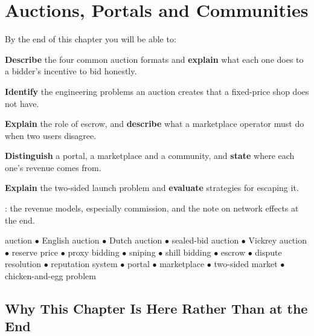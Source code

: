 \chapter{Auctions, Portals and Communities}\label{ch:auctions}

\begin{outcomes}
By the end of this chapter you will be able to:
\begin{tight}
  \item \textbf{Describe} the four common auction formats and \textbf{explain}
        what each one does to a bidder's incentive to bid honestly.
  \item \textbf{Identify} the engineering problems an auction creates that a
        fixed-price shop does not have.
  \item \textbf{Explain} the role of escrow, and \textbf{describe} what a
        marketplace operator must do when two users disagree.
  \item \textbf{Distinguish} a portal, a marketplace and a community, and
        \textbf{state} where each one's revenue comes from.
  \item \textbf{Explain} the two-sided launch problem and \textbf{evaluate}
        strategies for escaping it.
\end{tight}
\end{outcomes}

\begin{prereq}
: the revenue models, especially commission, and the note on
network effects at the end.
\end{prereq}

\begin{keyterms}
auction $\bullet$ English auction $\bullet$ Dutch auction $\bullet$ sealed-bid
auction $\bullet$ Vickrey auction $\bullet$ reserve price $\bullet$ proxy
bidding $\bullet$ sniping $\bullet$ shill bidding $\bullet$ escrow $\bullet$
dispute resolution $\bullet$ reputation system $\bullet$ portal
$\bullet$ marketplace $\bullet$ two-sided market $\bullet$ chicken-and-egg
problem
\end{keyterms}

\section{Why This Chapter Is Here Rather Than at the End}

